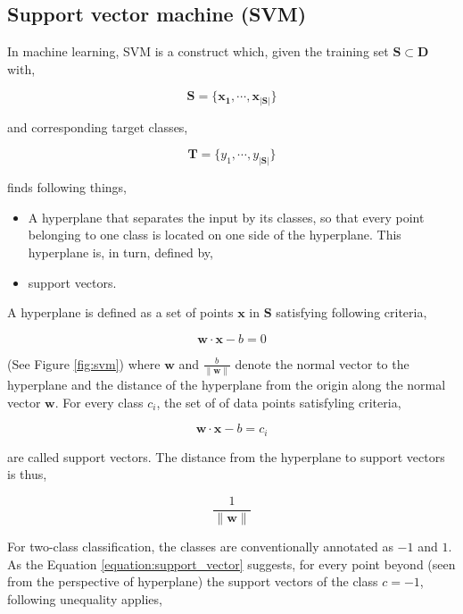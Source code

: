 \documentclass[pdftex,12pt,a4paper]{report}
\begin{document}
\subsection{Support vector machine (SVM)}
\label{subsection:svm}

In machine learning, SVM is a construct which, given the training set $\mathbf{S} \subset \mathbf{D}$ with,

$$
\mathbf{S} = \{\mathbf{x_1}, \cdots, \mathbf{x}_{ \vert \mathbf{S} \vert }\}
$$

and corresponding target classes,

$$
\mathbf{T} = \{y_1, \cdots, y_{\vert \mathbf{S} \vert}\}
$$

finds following things,

\begin{itemize}
\item A hyperplane that separates the input by its classes, so that every point belonging to one class is located on one side of the hyperplane. This hyperplane is, in turn, defined by,
\item support vectors.
\end{itemize}

A hyperplane is defined as a set of points $\mathbf{x}$ in $\mathbf{S}$ satisfying following criteria,

\begin{equation}
\mathbf{w} \cdot \mathbf{x} - b = 0
\label{equation:hyperplane}
\end{equation}

(See Figure \ref{fig:svm}) where $\mathbf{w}$ and $\frac{b}{\| \mathbf{w} \|}$ denote the normal vector to the hyperplane and the distance of the hyperplane from the origin along the normal vector $\mathbf{w}$. For every class $c_i$, the set of of data points satisfyling criteria,

\begin{equation}
\mathbf{w} \cdot \mathbf{x} - b = c_i
\label{equation:support_vector}
\end{equation}

are called support vectors. The distance from the hyperplane to support vectors is thus,

$$\frac{1}{\| \mathbf{w} \|}$$

For two-class classification, the classes are conventionally annotated as $-1$ and $1$. As the Equation \ref{equation:support_vector} suggests, for every point beyond (seen from the perspective of hyperplane) the support vectors of the class $c = -1$, following unequality applies,
\end{document}
